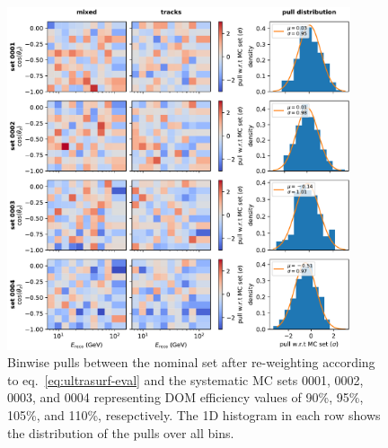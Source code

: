 \begin{figure}
    \centering
    \includegraphics[width=0.9\textwidth]{figures/measurement/systematics/detector/ultrasurface_performance_vs_blind_fits_domeff_sets.pdf}
    \caption{Binwise pulls between the nominal set after re-weighting according to eq.~\ref{eq:ultrasurf-eval} and the systematic MC sets 0001, 0002, 0003, and 0004 representing DOM efficiency values of 90\%, 95\%, 105\%, and 110\%, resepctively. The 1D histogram in each row shows the distribution of the pulls over all bins.}
    \label{fig:ultrasurf-binwise-pulls}
\end{figure}

